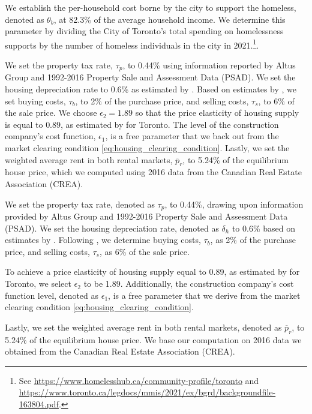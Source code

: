 \documentclass[parskip=full]{article}
\begin{document}
We establish the per-household cost borne by the city to support the homeless, denoted as $\theta_{b}$, at 82.3\% of the average household income. We determine this parameter by dividing the City of Toronto's total spending on homelessness supports by the number of homeless individuals in the city in 2021.\footnote{See \url{https://www.homelesshub.ca/community-profile/toronto} and \url{https://www.toronto.ca/legdocs/mmis/2021/ex/bgrd/backgroundfile-163804.pdf}.}.

We set the property tax rate, $\tau_p$, to 0.44\% using information reported by Altus Group and 1992-2016 Property Sale and Assessment Data (PSAD). We set the housing depreciation rate to 0.6\% as estimated by \citet{rosenthal-2014}. Based on estimates by \citet{gm-2003}, we set buying costs, $\tau_{b}$, to 2\% of the purchase price, and selling costs, $\tau_{s}$, to 6\% of the sale price. We choose $\epsilon_{2}=1.89$ so that the price elasticity of housing supply is equal to $0.89$, as estimated by \citet{piaxao-2021} for Toronto. The level of the construction company's cost function, $\epsilon_1$, is a free parameter that we back out from the market clearing condition \eqref{eq:housing_clearing_condition}. Lastly, we set the weighted average rent in both rental markets, $\overline{p}_{r}$, to 5.24\% of the equilibrium house price, which we computed using 2016 data from the Canadian Real Estate Association (CREA).

We set the property tax rate, denoted as $\tau_p$, to 0.44\%, drawing upon information provided by Altus Group and 1992-2016 Property Sale and Assessment Data (PSAD). We set the housing depreciation rate, denoted as $\delta_{h}$ to 0.6\% based on estimates by \citet{rosenthal-2014}. Following \citet{gm-2003}, we determine buying costs, $\tau_{b}$, as 2\% of the purchase price, and selling costs, $\tau_{s}$, as 6\% of the sale price.

To achieve a price elasticity of housing supply equal to 0.89, as estimated by \citet{piaxao-2021} for Toronto, we select $\epsilon_{2}$ to be 1.89. Additionally, the construction company's cost function level, denoted as $\epsilon_1$, is a free parameter that we derive from the market clearing condition \eqref{eq:housing_clearing_condition}.

Lastly, we set the weighted average rent in both rental markets, denoted as $\overline{p}_{r}$, to 5.24\% of the equilibrium house price. We base our computation on 2016 data we obtained from the Canadian Real Estate Association (CREA).
\end{document}
